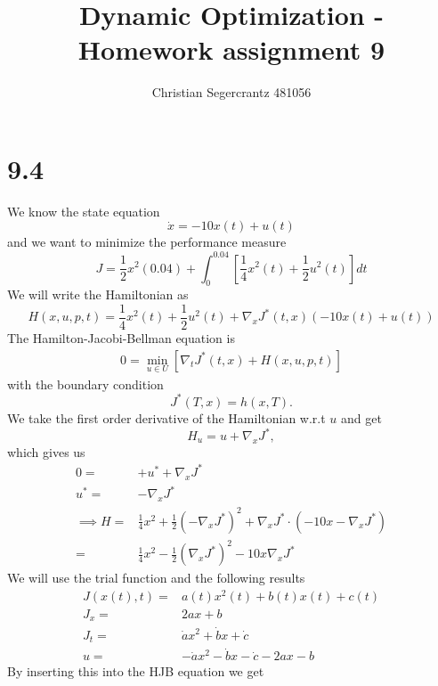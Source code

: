 \documentclass{article}
\title{Dynamic Optimization - Homework assignment 9}
\author{Christian Segercrantz 481056}
\begin{document}
	\maketitle
	\pagebreak

\section*{9.4}

We know the state equation 
\begin{equation}
	\dot{x} = -10x(t) + u(t)
\end{equation}
and we want to minimize the performance measure
\begin{equation}
	J= \frac{1}{2}x^2(0.04) + \int_{0}^{0.04} \left[ \frac{1}{4}x^2(t) + \frac{1}{2}u^2(t) \right]  dt
\end{equation}
We will write the Hamiltonian as
\begin{equation}
	H(x,u,p,t) = \frac{1}{4}x^2(t) + \frac{1}{2}u^2(t) + \nabla_x J^* (t,x)(-10x(t) + u(t))
\end{equation}
The Hamilton-Jacobi-Bellman equation is
\begin{align}
	0 = \min_{u\in U}\left[ \nabla_t J^*(t,x) + H(x,u,p,t)\right]
\end{align}
with the boundary condition
\begin{equation}
	J^*(T,x) = h(x,T).
\end{equation}
We take the first order derivative of the Hamiltonian w.r.t $u$ and get
\begin{equation}
	H_u = u+\nabla_xJ^*,
\end{equation}
which gives us
\begin{align}
	0 =&  + u^*+\nabla_xJ^* \\
	u^* =& - \nabla_xJ^* \\
	\implies H =&  \frac{1}{4}x^2 + \frac{1}{2}(- \nabla_xJ^*)^2 + \nabla_x J^*\cdot(-10x  - \nabla_xJ^*) \\
	=& \frac{1}{4}x^2 - \frac{1}{2}(\nabla_xJ^*)^2 -10x\nabla_x J^* 
\end{align}
We will use the trial function and the following results
\begin{align}
	J(x(t),t) =& a(t)x^2(t) + b(t)x(t) + c(t) \\
	J_x =& 2ax + b \\
	J_t =& \dot{a}x^2 + \dot{b}x + \dot{c} \\
	u =& -\dot{a}x^2 - \dot{b}x - \dot{c} - 2ax - b
\end{align}
By inserting this into the HJB equation we get
\end{document}
